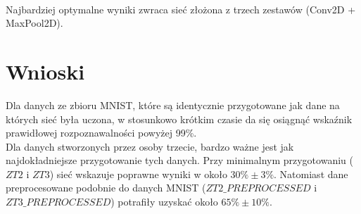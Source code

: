 \phantom{.}\\
Najbardziej optymalne wyniki zwraca sieć złożona z trzech zestawów (Conv2D + MaxPool2D).

\section*{Wnioski}
Dla danych ze zbioru MNIST, które są identycznie przygotowane jak dane na których sieć była uczona, w stosunkowo krótkim czasie da się osiągnąć wskaźnik prawidłowej rozpoznawalności powyżej 99\%.\\
Dla danych stworzonych przez osoby trzecie, bardzo ważne jest jak najdokładniejsze przygotowanie tych danych. Przy minimalnym przygotowaniu ($ZT2$ i $ZT3$) sieć wskazuje poprawne wyniki w około $30\% \pm 3\%$. Natomiast dane preprocesowane podobnie do danych MNIST ($ZT2\_PREPROCESSED$ i $ZT3\_PREPROCESSED$) potrafiły uzyskać około $65\% \pm 10\%$.
